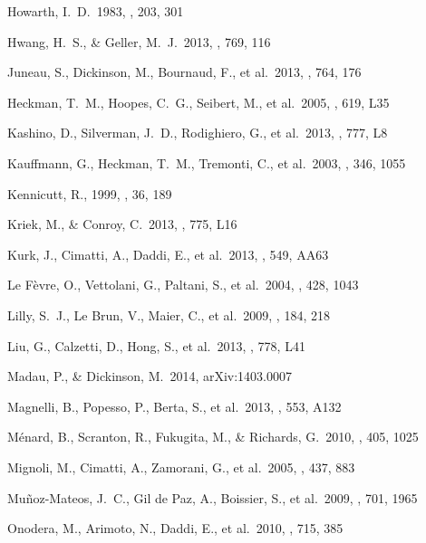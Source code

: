 \documentclass[preprint]{aastex}
\begin{document}
\begin{thebibliography}
 Howarth, I.~D.\ 1983, \mnras, 203, 301

 Hwang, H.~S., \& Geller, M.~J.\ 2013,
\apj, 769, 116

 Juneau, S., Dickinson, 
M., Bournaud, F., et al.\ 2013, \apj, 764, 176

 Heckman, T.~M., Hoopes, 
C.~G., Seibert, M., et al.\ 2005, \apjl, 619, L35

 Kashino, D., Silverman, 
J.~D., Rodighiero, G., et al.\ 2013, \apjl, 777, L8

 Kauffmann, G., 
Heckman, T.~M., Tremonti, C., et al.\ 2003, \mnras, 346, 1055

 Kennicutt, R., 1999, \araa, 36, 189

 Kriek, M., \& Conroy, C.\ 2013,
\apjl, 775, L16 

 Kurk, J., Cimatti, A., Daddi, E., et al.\
2013, \aap, 549, AA63

 Le F{\`e}vre, O., Vettolani, G.,
Paltani, S., et al.\ 2004, \aap, 428, 1043

 Lilly, S.~J., Le Brun, V.,
Maier, C., et al.\ 2009, \apjs, 184, 218

 Liu, G., Calzetti, D., 
Hong, S., et al.\ 2013, \apjl, 778, L41

 Madau, P., \& Dickinson, M.\ 2014,
arXiv:1403.0007

 Magnelli, B., Popesso, P.,
Berta, S., et al.\ 2013, \aap, 553, A132

 M{\'e}nard, B., Scranton, R.,
Fukugita, M., \& Richards, G.\ 2010, \mnras, 405, 1025

 Mignoli, M., Cimatti, A., Zamorani,
G., et al.\ 2005, \aap, 437, 883

Mu{\~n}oz-Mateos, J.~C., Gil de Paz, A., Boissier, S., et al.\ 2009, \apj, 
701, 1965

 Onodera, M., Arimoto, 
N., Daddi, E., et al.\ 2010, \apj, 715, 385


\end{thebibliography}
\end{document}

